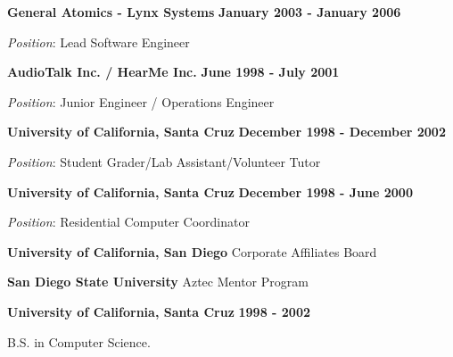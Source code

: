\documentclass{article}
\begin{document}
\vspace{\baselineskip}
{\bf General Atomics - Lynx Systems} 
\hfill {\bf January 2003 - January 2006} 
\par
{\it Position}: Lead Software Engineer
\vspace{\baselineskip}
\par
{\bf AudioTalk Inc. / HearMe Inc.} 
\hfill {\bf June 1998 - July 2001} 
\par
{\it Position}:  Junior Engineer / Operations Engineer
\par
\vspace{\baselineskip}
{\bf University of California, Santa Cruz} 
\hfill {\bf December 1998 - December 2002}
\par
{\it Position}:  Student Grader/Lab Assistant/Volunteer Tutor
\par
\vspace{\baselineskip}
{\bf University of California, Santa Cruz} 
\hfill {\bf December 1998 - June 2000}
\par
{\it Position}:  Residential Computer Coordinator
\par
\vspace{2\baselineskip}
{\bf University of California, San Diego} 
\hfill Corporate Affiliates Board
\par
{\bf San Diego State University} 
\hfill Aztec Mentor Program
\vspace{\baselineskip}
\par
\par
{}
{\bf University of California, Santa Cruz} 
\hspace*{\fill} {\bf 1998 - 2002}
\par
\vspace{.03in}
B.S. in Computer Science.
\end{document}
